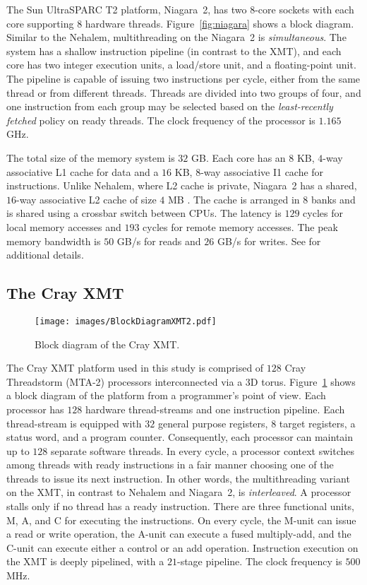 \documentclass{article}
\begin{document}
The Sun UltraSPARC T2 platform, Niagara~2, has two $8$-core sockets 
with each core supporting $8$ hardware threads.  
Figure~\ref{fig:niagara} shows a block diagram. 
Similar to the Nehalem, multithreading on the Niagara~2  is {\em simultaneous}.
The system has a shallow instruction pipeline (in contrast to the XMT), and each core has
two integer execution units, a load/store unit, and a floating-point unit. The pipeline is capable of 
issuing two instructions per cycle, either from the same thread or from different threads.
Threads are divided into two groups of four, and one instruction from each group may be
selected based on the {\em least-recently fetched} policy on ready threads. 
The clock frequency of the processor  is $1.165$ GHz.

The total size of the memory system is $32$ GB.
Each core has an $8$ KB, $4$-way associative L1 cache for data
and a $16$ KB, $8$-way associative I1 cache for instructions. 
Unlike Nehalem, where L2 cache is private, Niagara~2 has a shared, $16$-way
associative L2 cache of size $4$ MB .
The cache is arranged in $8$ banks and is shared using a crossbar switch between CPUs. 
The latency is $129$ cycles for local memory accesses and $193$ cycles for remote memory accesses. 
The peak memory bandwidth is $50$ GB/s for reads and $26$ GB/s for writes. 
See \cite{Shah-ASCC07} for additional details.

\subsection{The Cray XMT}
\label{sec:xmt}

\begin{figure}
\centering
\texttt{[image: images/BlockDiagramXMT2.pdf]}
\caption{Block diagram of the Cray XMT.}
\label{fig:xmt}
\end{figure}

The Cray XMT platform used in this study is comprised of $128$ Cray Threadstorm (MTA-2) 
processors interconnected via a $3$D torus.
Figure~\ref{fig:xmt} shows  a block diagram of the platform from a programmer's point of view.
Each processor has $128$ hardware thread-streams and one instruction pipeline. 
Each thread-stream is equipped with $32$ general purpose registers, 
$8$ target registers, a status word, and a program counter.
Consequently, each processor can maintain up to $128$ separate software threads.  
In every cycle, a processor context switches among threads with ready instructions in a 
fair manner choosing one of the threads to issue its next instruction.  
In other words, the multithreading variant on the XMT, in contrast to Nehalem and Niagara~2, 
is {\em interleaved}.
A processor stalls only if no thread has a ready instruction.
There are three functional  units, M, A, and C  for executing the instructions. 
On every cycle, the M-unit can issue a read or write operation, 
the A-unit can execute a fused multiply-add, and the C-unit can execute either a control or 
an add operation. Instruction execution on the XMT is deeply pipelined, with a $21$-stage pipeline.
The clock frequency is $500$ MHz.
\end{document}
